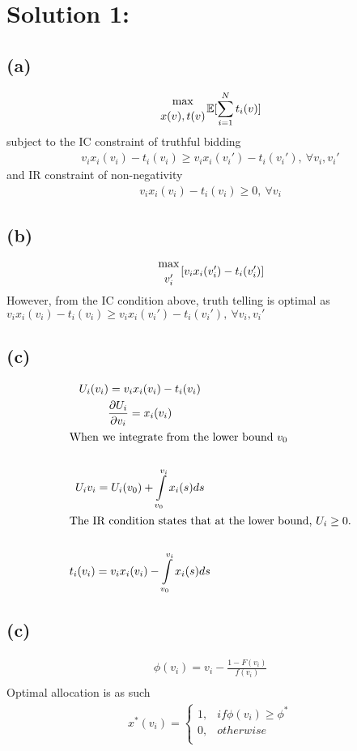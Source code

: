 \documentclass[10pt,a4paper]{article}
\begin{document}
\section*{Solution 1:}
  \subsection*{(a)}
    \begin{gather*}
      {\max\atop{x(v),t(v)}}\mathbb{E}[\sum\limits_{i=1}^N t_i(v)]
    \end{gather*}
    subject to the IC constraint of truthful bidding
    \begin{gather*}
      v_ix_i(v_i) - t_i(v_i) \geq v_ix_i(v_i')-t_i(v_i'), \ \forall v_i,v_i'
    \end{gather*}
    and IR constraint of non-negativity
    \begin{gather*}
      v_ix_i(v_i)-t_i(v_i)\geq0, \ \forall v_i
    \end{gather*}
  \subsection*{(b)}
    \begin{gather*}
      {\max\atop{v_i'}}[v_ix_i(v_i')-t_i(v_i')] \\
    \end{gather*}
    However, from the IC condition above, truth telling is optimal as $v_ix_i(v_i) - t_i(v_i) \geq v_ix_i(v_i')-t_i(v_i'), \ \forall v_i,v_i'$
  \subsection*{(c)}
    \begin{gather*}
      U_i(v_i) = v_ix_i(v_i) - t_i(v_i) \\
      \frac{\partial U_i}{\partial v_i} = x_i(v_i) \\
      \shortintertext{When we integrate from the lower bound $v_0$} \\
      U_iv_i = U_i(v_0) + \int\limits_{v_0}^{v_i}x_i(s)ds \\
      \shortintertext{The IR condition states that at the lower bound, $U_i\geq0$.} \\
      t_i(v_i) = v_ix_i(v_i) - \int\limits_{v_0}^{v_i}x_i(s)ds \\
    \end{gather*}
  \subsection*{(c)}
    \begin{gather*}
      \phi(v_i) = v_i - \frac{1-F(v_i)}{f(v_i)} \\
    \end{gather*}
    Optimal allocation is as such
    \begin{gather*}
      x^*(v_i) = \begin{cases}
        1, & if\phi(v_i)\geq \phi^* \\
        0, & otherwise \\
      \end{cases}
    \end{gather*}
\end{document}
